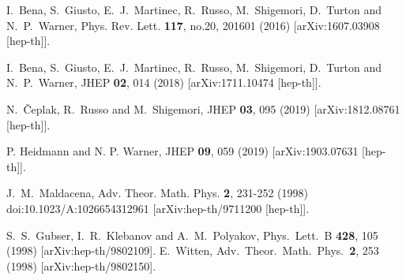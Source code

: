 \documentclass[11pt]{article}
\begin{document}
\begin{thebibliography}{99}
I.~Bena, S.~Giusto, E.~J.~Martinec, R.~Russo, M.~Shigemori, D.~Turton and N.~P.~Warner,
Phys. Rev. Lett. \textbf{117}, no.20, 201601 (2016)
[arXiv:1607.03908 [hep-th]].

I.~Bena, S.~Giusto, E.~J.~Martinec, R.~Russo, M.~Shigemori, D.~Turton and N.~P.~Warner,
JHEP \textbf{02}, 014 (2018)
[arXiv:1711.10474 [hep-th]].

N.~\v{C}eplak, R.~Russo and M.~Shigemori,
JHEP \textbf{03}, 095 (2019)
[arXiv:1812.08761 [hep-th]].

 P. Heidmann and N. P. Warner, JHEP {\bf 09}, 059 (2019) 
 [arXiv:1903.07631 [hep-th]].


  
J.~M.~Maldacena,
Adv. Theor. Math. Phys. \textbf{2}, 231-252 (1998)
doi:10.1023/A:1026654312961
[arXiv:hep-th/9711200 [hep-th]].
  
  S.~S.~Gubser, I.~R.~Klebanov and A.~M.~Polyakov,
  Phys.\ Lett.\  B {\bf 428}, 105 (1998)
  [arXiv:hep-th/9802109].
  E.~Witten,
  Adv.\ Theor.\ Math.\ Phys.\  {\bf 2}, 253 (1998)
  [arXiv:hep-th/9802150].
    


\end{thebibliography}
\end{document}
